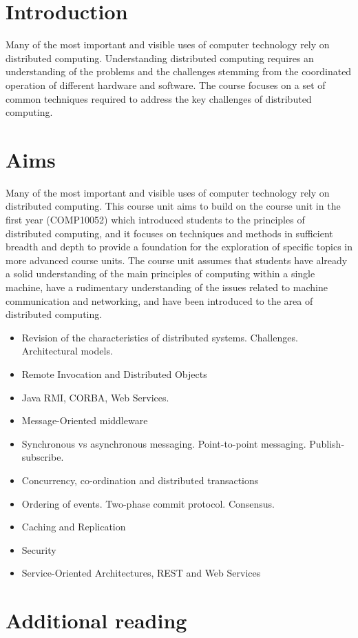 \section*{Introduction}

Many of the most important and visible uses of computer technology rely on
distributed computing. Understanding distributed computing requires an
understanding of the problems and the challenges stemming from the coordinated
operation of different hardware and software. The course focuses on a set of
common techniques required to address the key challenges of distributed
computing.

\section*{Aims}

Many of the most important and visible uses of computer technology rely on distributed computing. This course unit aims to build on the course unit in the first year (COMP10052) which introduced students to the principles of distributed computing, and it focuses on techniques and methods in sufficient breadth and depth to provide a foundation for the exploration of specific topics in more advanced course units. The course unit assumes that students have already a solid understanding of the main principles of computing within a single machine, have a rudimentary understanding of the issues related to machine communication and networking, and have been introduced to the area of distributed computing.

\begin{itemize}
  \item Revision of the characteristics of distributed systems. Challenges. Architectural models.
  \item Remote Invocation and Distributed Objects
  \item Java RMI, CORBA, Web Services.
  \item Message-Oriented middleware
  \item Synchronous vs asynchronous messaging. Point-to-point messaging. Publish-subscribe.
  \item Concurrency, co-ordination and distributed transactions
  \item Ordering of events. Two-phase commit protocol. Consensus.
  \item Caching and Replication
  \item Security
  \item Service-Oriented Architectures, REST and Web Services
\end{itemize}

\section*{Additional reading}

